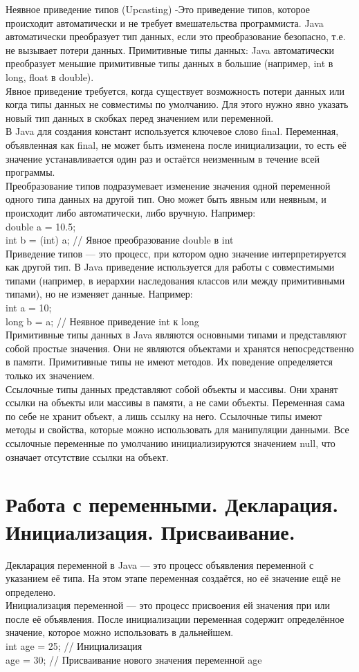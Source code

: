 Неявное приведение типов (Upcasting) -Это приведение типов, которое происходит автоматически и не требует вмешательства программиста. Java автоматически преобразует тип данных, если это преобразование безопасно, т.е. не вызывает потери данных. Примитивные типы данных: Java автоматически преобразует меньшие примитивные типы данных в большие (например, int в long, float в double).  \\
Явное приведение требуется, когда существует возможность потери данных или когда типы данных не совместимы по умолчанию. Для этого нужно явно указать новый тип данных в скобках перед значением или переменной. \\
В Java для создания констант используется ключевое слово final. Переменная, объявленная как final, не может быть изменена после инициализации, то есть её значение устанавливается один раз и остаётся неизменным в течение всей программы. \\
\normalsize{Преобразование типов подразумевает изменение значения одной переменной одного типа данных на другой тип. Оно может быть явным или неявным, и происходит либо автоматически, либо вручную. Например: \\
double a = 10.5; \\
int b = (int) a;  // Явное преобразование double в int} \\
\normalsize{Приведение типов — это процесс, при котором одно значение интерпретируется как другой тип. В Java приведение используется для работы с совместимыми типами (например, в иерархии наследования классов или между примитивными типами), но не изменяет данные. Например:  \\
int a = 10; \\
long b = a;  // Неявное приведение int к long} \\
Примитивные типы данных в Java являются основными типами и представляют собой простые значения. Они не являются объектами и хранятся непосредственно в памяти. Примитивные типы не имеют методов. Их поведение определяется только их значением. \\
Ссылочные типы данных представляют собой объекты и массивы. Они хранят ссылки на объекты или массивы в памяти, а не сами объекты. Переменная сама по себе не хранит объект, а лишь ссылку на него. Ссылочные типы имеют методы и свойства, которые можно использовать для манипуляции данными. Все ссылочные переменные по умолчанию инициализируются значением null, что означает отсутствие ссылки на объект. 
\section{Работа с переменными. Декларация. Инициализация. Присваивание.} 
\normalsize{Декларация переменной в Java — это процесс объявления переменной с указанием её типа. На этом этапе переменная создаётся, но её значение ещё не определено. \\
Инициализация переменной — это процесс присвоения ей значения при или после её объявления. После инициализации переменная содержит определённое значение, которое можно использовать в дальнейшем. \\
int age = 25; // Инициализация \\
age = 30;     // Присваивание нового значения переменной age }
